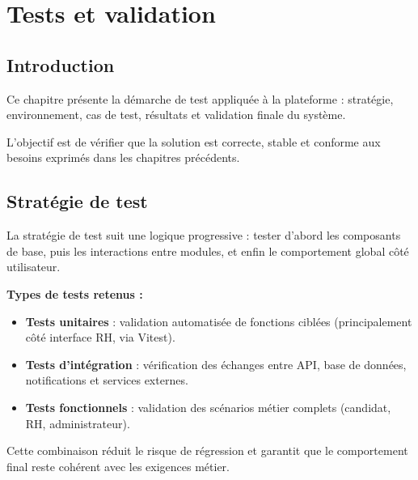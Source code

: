 
\chapter{Tests et validation}
\graphicspath{{Isipfe/Figures/}}

\section*{Introduction}

Ce chapitre présente la démarche de test appliquée à la plateforme :
stratégie, environnement, cas de test, résultats et validation finale du
système.

L'objectif est de vérifier que la solution est correcte, stable et conforme
aux besoins exprimés dans les chapitres précédents.


\section{Stratégie de test}

La stratégie de test suit une logique progressive : tester d'abord les
composants de base, puis les interactions entre modules, et enfin le
comportement global côté utilisateur.

\textbf{Types de tests retenus :}
\begin{itemize}
    \item \textbf{Tests unitaires} : validation automatisée de fonctions
    ciblées (principalement côté interface RH, via Vitest).
    \item \textbf{Tests d'intégration} : vérification des échanges entre
    API, base de données, notifications et services externes.
    \item \textbf{Tests fonctionnels} : validation des scénarios métier
    complets (candidat, RH, administrateur).
\end{itemize}

Cette combinaison réduit le risque de régression et garantit que le
comportement final reste cohérent avec les exigences métier.

